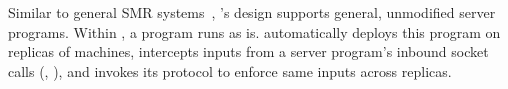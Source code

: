 Similar to general SMR systems~\cite{rex:eurosys14,crane:sosp15},
\xxx's design supports general, unmodified server programs. Within \xxx, a
program runs as is. \xxx automatically deploys this program on replicas
of machines, intercepts inputs from a server program's 
inbound socket calls (\eg, \recv), and invokes its \paxos protocol to enforce 
same inputs across replicas.






%




